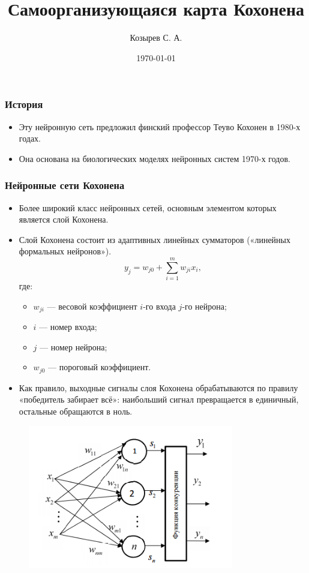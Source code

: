 \documentclass[aspectratio=169]{beamer}
\title{Самоорганизующаяся карта Кохонена}
\author{Козырев С. А.}
\institute{СПбГУ}
\date{\today}
\begin{document}
\frame{\titlepage}

\begin{frame}
  \frametitle{История}
  \begin{itemize}
    \item Эту нейронную сеть предложил финский профессор Теуво Кохонен в 1980-х годах.
    \item Она основана на биологических моделях нейронных систем 1970-х годов.
  \end{itemize}
\end{frame}

\begin{frame}
  \frametitle{Нейронные сети Кохонена}
  \begin{itemize}
    \item Более широкий класс нейронных сетей, основным элементом которых является слой
    Кохонена.
    \item Слой Кохонена состоит из адаптивных линейных сумматоров («линейных
    формальных нейронов»).
    \[
      y_{j}=w_{{j0}}+\sum _{{i=1}}^{m}w_{{ji}}x_{i},
    \]
    где:
    \begin{itemize}
      \setlength\itemsep{0em}
      \item $w_{{ji}}$ — весовой коэффициент $i$-го входа $j$-го нейрона;
      \item $i$ — номер входа;
      \item $j$ — номер нейрона;
      \item $w_{{j0}}$ — пороговый коэффициент.
    \end{itemize}
    \item Как правило, выходные сигналы слоя Кохонена обрабатываются по правилу
    «победитель забирает всё»: наибольший сигнал превращается в единичный,
    остальные обращаются в ноль.
  \end{itemize}
\end{frame}

\begin{frame}
  \begin{figure}
    \centering
    \includegraphics[width=0.8\textwidth]{network.png}
  \end{figure}
\end{frame}
\end{document}
